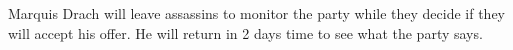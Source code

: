Marquis Drach will leave assassins to monitor the party while they decide if they will accept his offer.
He will return in 2 days time to see what the party says.
